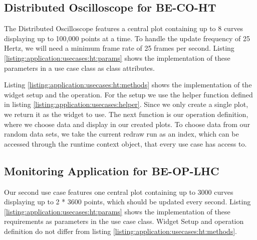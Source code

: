 

\subsection{Distributed Oscilloscope for BE-CO-HT}

The Distributed Oscilloscope features a central plot containing up to 8 curves
displaying up to 100,000 points at a time. To handle the update frequency of 25
Hertz, we will need a minimum frame rate of 25 frames per second. Listing
\ref{listing:application:usecases:ht:params} shows the implementation of these
parameters in a use case class as class attributes.



Listing \ref{listing:application:usecases:ht:methods} shows the implementation
of the widget setup and the operation. For the setup we use the helper function
defined in listing \ref{listing:application:usecases:helper}. Since we only
create a single plot, we return it as the widget to use. The next function is
our operation definition, where we choose data and display in our created
plots. To choose data from our random data sets, we take the current redraw run
as an index, which can be accessed through the runtime context object, that
every use case has access to.



\subsection{Monitoring Application for BE-OP-LHC}

Our second use case features one central plot containing up to 3000 curves
displaying up to 2 * 3600 points, which should be updated every second. Listing
\ref{listing:application:usecases:ht:params} shows the implementation of these
requirements as parameters in the use case class. Widget Setup and operation
definition do not differ from listing
\ref{listing:application:usecases:ht:methods}.

